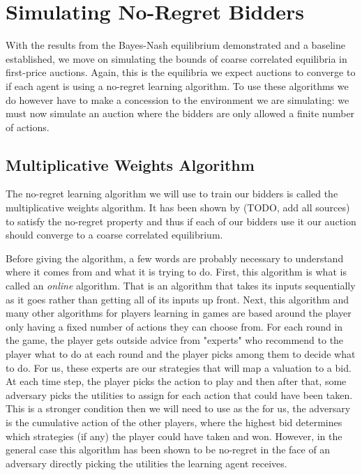 \documentclass[12pt,twoside]{reedthesis}
\begin{document}
\section{Simulating No-Regret Bidders}
With the results from the Bayes-Nash equilibrium demonstrated and a baseline established, we move on simulating the bounds of coarse correlated equilibria in first-price auctions. Again, this is the equilibria we expect auctions to converge to if each agent is using a no-regret learning algorithm. To use these algorithms we do however have to make a concession to the environment we are simulating: we must now simulate an auction where the bidders are only allowed a finite number of actions.

\subsection{Multiplicative Weights Algorithm}
The no-regret learning algorithm we will use to train our bidders is called the multiplicative weights algorithm. It has been shown by (TODO, add all sources) to satisfy the no-regret property and thus if each of our bidders use it our auction should converge to a coarse correlated equilibrium. 

Before giving the algorithm, a few words are probably necessary to understand where it comes from and what it is trying to do. First, this algorithm is what is called an \textit{online} algorithm. That is an algorithm that takes its inputs sequentially as it goes rather than getting all of its inputs up front. Next, this algorithm and many other algorithms for players learning in games are based around the player only having a fixed number of actions they can choose from. For each round in the game, the player gets outside advice from "experts" who recommend to the player what to do at each round and the player picks among them to decide what to do. For us, these experts are our strategies that will map a valuation to a bid. At each time step, the player picks the action to play and then after that, some adversary picks the utilities to assign for each action that could have been taken. This is a stronger condition then we will need to use as the for us, the adversary is the cumulative action of the other players, where the highest bid determines which strategies (if any) the player could have taken and won. However, in the general case this algorithm has been shown to be no-regret in the face of an adversary directly picking the utilities the learning agent receives.\\
\end{document}
